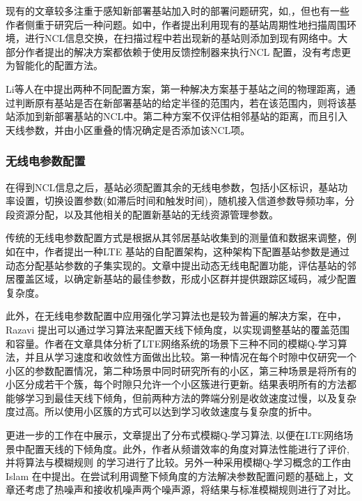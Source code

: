 ﻿\documentclass[11pt,draftclsnofoot,onecolumn,journal,letterpaper]{IEEEtran}
\begin{document}
现有的文章较多注重于感知新部署基站加入时的部署问题研究，如\cite{Lee2014},\cite{Kim2010}，但也有一些作者侧重于研究后一种问题。如\cite{Wainio2016}中，作者提出利用现有的基站周期性地扫描周围环境，进行NCL信息交换，在扫描过程中若出现新的基站则添加到现有网络中。大部分作者提出的解决方案都依赖于使用反馈控制器来执行NCL 配置，没有考虑更为智能化的配置方法。

Li等人在\cite{Li2007}中提出两种不同配置方案，第一种解决方案基于基站之间的物理距离，通过判断原有基站是否在新部署基站的给定半径的范围内，若在该范围内，则将该基站添加到新部署基站的NCL中。第二种方案不仅评估相邻基站的距离，而且引入天线参数，并由小区重叠的情况确定是否添加该NCL项。


\subsubsection{无线电参数配置}
在得到NCL信息之后，基站必须配置其余的无线电参数，包括小区标识，基站功率设置，切换设置参数(如滞后时间和触发时间)，随机接入信道参数导频功率，分段资源分配，以及其他相关的配置新基站的无线资源管理参数。

传统的无线电参数配置方式是根据从其邻居基站收集到的测量值和数据来调整，例如在\cite{Sanneck2010}中，作者提出一种LTE 基站的自配置架构，这种架构下配置基站参数是通过动态分配基站参数的子集实现的。文章中提出动态无线电配置功能，评估基站的邻居覆盖区域，以确定新基站的最佳参数，形成小区群并提供跟踪区域码，减少配置复杂度。

此外，在无线电参数配置中应用强化学习算法也是较为普遍的解决方案，在\cite{Razavi2010}中，Razavi 提出可以通过学习算法来配置天线下倾角度，以实现调整基站的覆盖范围和容量。作者在文章具体分析了LTE网络系统的场景下三种不同的模糊Q-学习算法，并且从学习速度和收敛性方面做出比较。第一种情况在每个时隙中仅研究一个小区的参数配置情况，第二种场景中同时研究所有的小区，第三种场景是将所有的小区分成若干个簇，每个时隙只允许一个小区簇进行更新。结果表明所有的方法都能够学习到最佳天线下倾角，但前两种方法的弊端分别是收敛速度过慢，以及复杂度过高。所以使用小区簇的方式可以达到学习收敛速度与复杂度的折中。

更进一步的工作在\cite{Razavi2010a}中展示，文章提出了分布式模糊Q-学习算法, 以便在LTE网络场景中配置天线的下倾角度。此外，作者从频谱效率的角度对算法性能进行了评价, 并将算法与模糊规则 的学习进行了比较。另外一种采用模糊Q-学习概念的工作由Islam 在\cite{Islam2012}中提出。在尝试利用调整下倾角度的方法解决参数配置问题的基础上，文章还考虑了热噪声和接收机噪声两个噪声源，将结果与标准模糊规则进行了对比。

\end{document}
